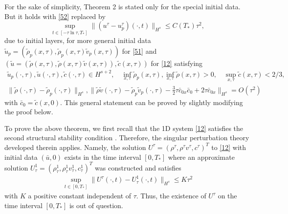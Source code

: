 \documentclass{article}
\theoremstyle{plain}
\begin{document}
\begin{rem}
For the sake of simplicity, Theorem 2 is stated only for the special initial data. But it holds with \eqref{52} replaced by
\begin{equation*}\label{eq:Result}
    \sup_{t \in [-\tau\ln\tau, T_*]} \|(u^\tau-
    u^\tau_p)(\cdot,t)\|_{H^s} \le C(T_*) \tau^2,
  \end{equation*}
due to initial layers, for more general initial data
${\tilde u}_p =({\tilde \rho}_p(x, \tau),\tilde{\rho}_p(x,\tau){\tilde v}_p(x, \tau))$ for \eqref{51} and $ ({\tilde u} =({\tilde \rho}(x, \tau),\tilde{\rho}(x,\tau){\tilde v}(x, \tau)), \tilde {c}(x, \tau))$ for \eqref{12} satisfying
  \begin{eqnarray*}
    \tilde{u}_p(\cdot,\tau),\tilde{u}(\cdot,\tau),\tilde{c}(\cdot,\tau) \in H^{s+2}, \quad  \inf_{x, \tau} \tilde{\rho}_p(x,\tau), \inf_{x, \tau} \tilde{\rho}(x,\tau)>0, \quad \sup_{x, \tau} \tilde{c}(x,\tau)< 2/3, \nonumber  \\
    \|\tilde{\rho}(\cdot,\tau)-\tilde{\rho}_p(\cdot,\tau)\|_{H^s}, \| \tilde{\rho} \tilde{v}(\cdot,\tau)-\tilde{\rho}_p\tilde{v}_p(\cdot,\tau)- \frac{3}{2} \tau \bar{c}_{0x} \bar{c}_0 +2 \tau \bar{c}_{0x}\|_{H^s}  = O(\tau^2)
  \end{eqnarray*}
  with $\bar{c}_0=\tilde{c}(x,0)$. This general statement can be proved by slightly modifying the proof below.
\end{rem}

To prove the above theorem, we first  recall that the 1D system \eqref{12} satisfies the second structural stability condition \cite{yong1992singular,yong1999singular}. Therefore, the singular perturbation theory developed therein applies. Namely, the solution $U^\tau = (\rho^\tau, \rho^\tau v^\tau, c^\tau)^T$ to \eqref{12} with initial data $(\bar{u},0)$ exists in the time interval $[0,T_*]$ where an approximate solution $U_\tau^1=(\rho_\tau^1,\rho_\tau^1 v_\tau^1, c^1_\tau)^T$
was constructed and satisfies
\begin{eqnarray}\label{53}
  \sup_{t \in [0, T_*]} \|U^\tau(\cdot, t) - U_\tau^1(\cdot, t)\|_{H^s} \le K\tau^2
\end{eqnarray}
with $K$ a positive constant independent of $\tau$. Thus, the existence of $U^\tau$ on the time interval $[0,T_*]$ is out of question.
\end{document}

